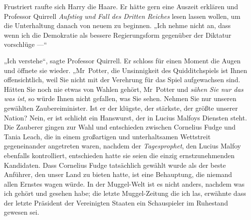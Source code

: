 Frustriert raufte sich Harry die Haare. Er hätte gern eine Auszeit erklären und Professor Quirrell \emph{Aufstieg und Fall des Dritten Reiches} lesen lassen wollen, um die Unterhaltung danach von neuem zu beginnen.
„Ich nehme nicht an, dass wenn ich die Demokratie als bessere Regierungsform gegenüber der Diktatur vorschlüge —“

„Ich verstehe“, sagte Professor Quirrell. Er schloss für einen Moment die Augen und öffnete sie wieder.
„Mr~Potter, die Unsinnigkeit des Quidditchspiels ist Ihnen offensichtlich, weil Sie nicht mit der Verehrung für das Spiel aufgewachsen sind. Hätten Sie noch nie etwas von Wahlen gehört, Mr~Potter und \emph{sähen Sie nur das was ist}, so würde Ihnen nicht gefallen, was Sie sehen. Nehmen Sie nur unseren gewählten Zaubereiminister. Ist er der klügste, der stärkste, der größte unserer Nation? Nein, er ist schlicht ein Hanswurst, der in Lucius Malfoys Diensten steht. Die Zauberer gingen zur Wahl und entschieden zwischen Cornelius Fudge und Tania Leach, die in einem großartigen und unterhaltsamen Wettstreit gegeneinander angetreten waren, nachdem der \emph{Tagesprophet}, den Lucius Malfoy ebenfalls kontrolliert, entschieden hatte sie seien die einzig ernstzunehmenden Kandidaten. Dass Cornelius Fudge tatsächlich gewählt wurde als der beste Anführer, den unser Land zu bieten hatte, ist eine Behauptung, die niemand allen Ernstes wagen würde. In der Muggel-Welt ist es nicht anders, nachdem was ich gehört und gesehen habe; die letzte Muggel-Zeitung die ich las, erwähnte dass der letzte Präsident der Vereinigten Staaten ein Schauspieler im Ruhestand gewesen sei.%
